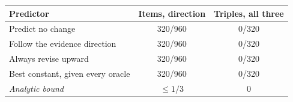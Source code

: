 \begin{tabular}{lcc}
\toprule
Predictor & Items, direction & Triples, all three \\
\midrule
Predict no change & 320/960 & 0/320 \\
Follow the evidence direction & 320/960 & 0/320 \\
Always revise upward & 320/960 & 0/320 \\
Best constant, given every oracle & 320/960 & 0/320 \\
\midrule
\emph{Analytic bound} & $\leq 1/3$ & $0$ \\
\bottomrule
\end{tabular}
